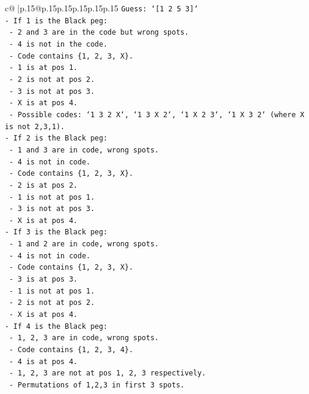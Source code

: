 \documentclass{article}
\begin{document}
{\begin{supertabular}{c@{$\;$}|p{.15\linewidth}@{}p{.15\linewidth}p{.15\linewidth}p{.15\linewidth}p{.15\linewidth}p{.15\linewidth}}
{{{\texttt{Guess: `{[}1 2 5 3{]}`} \\
\texttt{{-} If 1 is the Black peg:} \\
\texttt{  {-} 2 and 3 are in the code but wrong spots.} \\
\texttt{  {-} 4 is not in the code.} \\
\texttt{  {-} Code contains \{1, 2, 3, X\}.} \\
\texttt{  {-} 1 is at pos 1.} \\
\texttt{  {-} 2 is not at pos 2.} \\
\texttt{  {-} 3 is not at pos 3.} \\
\texttt{  {-} X is at pos 4.} \\
\texttt{  {-} Possible codes: `1 3 2 X`, `1 3 X 2`, `1 X 2 3`, `1 X 3 2` (where X is not 2,3,1).} \\
\texttt{{-} If 2 is the Black peg:} \\
\texttt{  {-} 1 and 3 are in code, wrong spots.} \\
\texttt{  {-} 4 is not in code.} \\
\texttt{  {-} Code contains \{1, 2, 3, X\}.} \\
\texttt{  {-} 2 is at pos 2.} \\
\texttt{  {-} 1 is not at pos 1.} \\
\texttt{  {-} 3 is not at pos 3.} \\
\texttt{  {-} X is at pos 4.} \\
\texttt{{-} If 3 is the Black peg:} \\
\texttt{  {-} 1 and 2 are in code, wrong spots.} \\
\texttt{  {-} 4 is not in code.} \\
\texttt{  {-} Code contains \{1, 2, 3, X\}.} \\
\texttt{  {-} 3 is at pos 3.} \\
\texttt{  {-} 1 is not at pos 1.} \\
\texttt{  {-} 2 is not at pos 2.} \\
\texttt{  {-} X is at pos 4.} \\
\texttt{{-} If 4 is the Black peg:} \\
\texttt{  {-} 1, 2, 3 are in code, wrong spots.} \\
\texttt{  {-} Code contains \{1, 2, 3, 4\}.} \\
\texttt{  {-} 4 is at pos 4.} \\
\texttt{  {-} 1, 2, 3 are not at pos 1, 2, 3 respectively.} \\
\texttt{  {-} Permutations of 1,2,3 in first 3 spots.} \\
}}}
\end{supertabular}}
\end{document}
